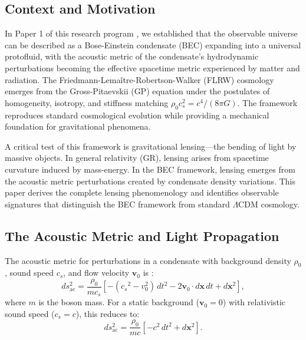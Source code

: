 \documentclass[11pt,a4paper]{article}
\newcommand{\cs}{\ensuremath{c_s}}
\theoremstyle{definition}
\theoremstyle{remark}
\begin{document}
\subsection{Context and Motivation}
\label{sec:motivation}

In Paper 1 of this research program \cite{Paper1}, we established that the observable universe can be described as a Bose-Einstein condensate (BEC) expanding into a universal protofluid, with the acoustic metric of the condensate's hydrodynamic perturbations becoming the effective spacetime metric experienced by matter and radiation. The Friedmann-Lema\^itre-Robertson-Walker (FLRW) cosmology emerges from the Gross-Pitaevskii (GP) equation under the postulates of homogeneity, isotropy, and stiffness matching $\rho_0 c_s^2 = c^4/(8\pi G)$. The framework reproduces standard cosmological evolution while providing a mechanical foundation for gravitational phenomena.

A critical test of this framework is gravitational lensing---the bending of light by massive objects. In general relativity (GR), lensing arises from spacetime curvature induced by mass-energy. In the BEC framework, lensing emerges from the acoustic metric perturbations created by condensate density variations. This paper derives the complete lensing phenomenology and identifies observable signatures that distinguish the BEC framework from standard $\Lambda$CDM cosmology.

\subsection{The Acoustic Metric and Light Propagation}
\label{sec:acoustic_metric_review}

The acoustic metric for perturbations in a condensate with background density $\rho_0$, sound speed $\cs$, and flow velocity $\mathbf{v}_0$ is \cite{Unruh1981,Barcelo2005}:
\begin{equation}
\label{eq:acoustic_metric}
ds_{\mathrm{ac}}^2 = \frac{\rho_0}{m \cs} \left[ -(\cs^2 - v_0^2) \, dt^2 - 2 \mathbf{v}_0 \cdot d\mathbf{x} \, dt + d\mathbf{x}^2 \right],
\end{equation}
where $m$ is the boson mass. For a static background ($\mathbf{v}_0 = 0$) with relativistic sound speed ($\cs = c$), this reduces to:
\begin{equation}
\label{eq:acoustic_static}
ds_{\mathrm{ac}}^2 = \frac{\rho_0}{mc} \left[ -c^2 \, dt^2 + d\mathbf{x}^2 \right].
\end{equation}
\end{document}

